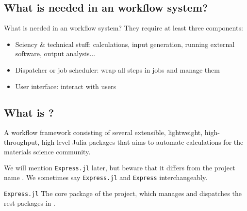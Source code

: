 \subsection{What is needed in an \ab{} workflow system?}

\begin{frame}{What is needed in an \ab{} workflow system?}
      They require at least three components:

      \begin{itemize}
            \item Sciency \& technical stuff: calculations, input generation, running external \ab{} software, output analysis...
            \item Dispatcher or job scheduler: wrap all steps in jobs and manage them
            \item User interface: interact with users
      \end{itemize}
\end{frame}

\subsection{What is \express{}?}

\begin{frame}{\subsecname}
      \begin{definitionblock}{\express{}}
            A workflow framework consisting of several extensible, lightweight, high-throughput,
            high-level Julia packages that aims to automate \ab{} calculations for the materials
            science community.
      \end{definitionblock}

      We will mention \texttt{Express.jl} later, but beware that it differs from the
      project name \express{}. We sometimes say \texttt{Express.jl} and \texttt{Express}
      interchangeably.

      \begin{definitionblock}{\texttt{Express.jl}}
            The core package of the \express{} project, which manages and dispatches the rest
            packages in \express{}.
      \end{definitionblock}
\end{frame}


